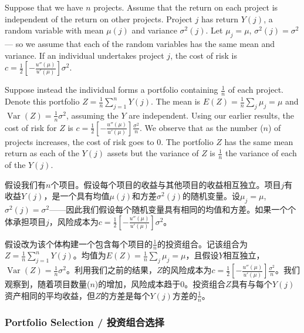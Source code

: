 \begin{original}
Suppose that we have $n$ projects. Assume that the return on each project is independent of the return on other projects. Project $j$ has return $Y(j)$, a random variable with mean $\mu(j)$ and variance $\sigma^2(j)$. Let $\mu_j = \mu$, $\sigma^2(j) = \sigma^2$ --- so we assume that each of the random variables has the same mean and variance. If an individual undertakes project $j$, the cost of risk is $c = \frac{1}{2}\left[-\frac{u''(\mu)}{u'(\mu)}\right]\sigma^2$.

Suppose instead the individual forms a portfolio containing $\frac{1}{n}$ of each project. Denote this portfolio $Z = \frac{1}{n}\sum_{j=1}^{n} Y(j)$. The mean is $E(Z) = \frac{1}{n}\sum_j \mu_j = \mu$ and $\operatorname{Var}(Z) = \frac{1}{n}\sigma^2$, assuming the $Y$ are independent. Using our earlier results, the cost of risk for $Z$ is $c = \frac{1}{2}\left[-\frac{u''(\mu)}{u'(\mu)}\right]\frac{\sigma^2}{n}$. We observe that as the number ($n$) of projects increases, the cost of risk goes to 0. The portfolio $Z$ has the same mean return as each of the $Y(j)$ assets but the variance of $Z$ is $\frac{1}{n}$ the variance of each of the $Y(j)$.
\end{original}
\begin{translation}
假设我们有$n$个项目。假设每个项目的收益与其他项目的收益相互独立。项目$j$有收益$Y(j)$，是一个具有均值$\mu(j)$和方差$\sigma^2(j)$的随机变量。设$\mu_j = \mu$, $\sigma^2(j) = \sigma^2$——因此我们假设每个随机变量具有相同的均值和方差。如果一个个体承担项目$j$，风险成本为$c = \frac{1}{2}\left[-\frac{u''(\mu)}{u'(\mu)}\right]\sigma^2$。

假设改为该个体构建一个包含每个项目的$\frac{1}{n}$的投资组合。记该组合为$Z = \frac{1}{n}\sum_{j=1}^{n} Y(j)$。均值为$E(Z) = \frac{1}{n}\sum_j \mu_j = \mu$，且假设$Y$相互独立，$\operatorname{Var}(Z) = \frac{1}{n}\sigma^2$。利用我们之前的结果，$Z$的风险成本为$c = \frac{1}{2}\left[-\frac{u''(\mu)}{u'(\mu)}\right]\frac{\sigma^2}{n}$。我们观察到，随着项目数量($n$)的增加，风险成本趋于0。投资组合$Z$具有与每个$Y(j)$资产相同的平均收益，但$Z$的方差是每个$Y(j)$方差的$\frac{1}{n}$。
\end{translation}

\subsubsection{Portfolio Selection / 投资组合选择}

